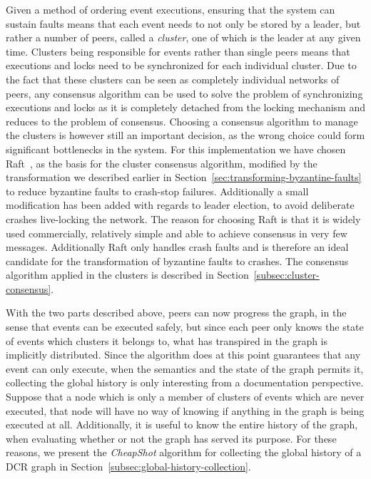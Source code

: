 \documentclass{article}
\begin{document}
	Given a method of ordering event executions, ensuring that the system can sustain faults means that each event needs to not only be stored by a leader, but rather a number of peers, called a \textit{cluster}, one of which is the leader at any given time.
	Clusters being responsible for events rather than single peers means that executions and locks need to be synchronized for each individual cluster.
	Due to the fact that these clusters can be seen as completely individual networks of peers, any consensus algorithm can be used to solve the problem of synchronizing executions and locks as it is completely detached from the locking mechanism and reduces to the problem of consensus.
	Choosing a consensus algorithm to manage the clusters is however still an important decision, as the wrong choice could form significant bottlenecks in the system.
	For this implementation we have chosen Raft~\cite{ongaro_search_2014}, as the basis for the cluster consensus algorithm, modified by the transformation we described earlier in Section~\ref{sec:transforming-byzantine-faults} to reduce byzantine faults to crash-stop failures.
    Additionally a small modification has been added with regards to leader election, to avoid deliberate crashes live-locking the network.
	The reason for choosing Raft is that it is widely used commercially, relatively simple and able to achieve consensus in very few messages.
	Additionally Raft only handles crash faults and is therefore an ideal candidate for the transformation of byzantine faults to crashes.
	The consensus algorithm applied in the clusters is described in Section~\ref{subsec:cluster-consensus}.

	With the two parts described above, peers can now progress the graph, in the sense that events can be executed safely, but since each peer only knows the state of events which clusters it belongs to, what has transpired in the graph is implicitly distributed.
	Since the algorithm does at this point guarantees that any event can only execute, when the semantics and the state of the graph permits it, collecting the global history is only interesting from a documentation perspective.
	Suppose that a node which is only a member of clusters of events which are never executed, that node will have no way of knowing if anything in the graph is being executed at all.
	Additionally, it is useful to know the entire history of the graph, when evaluating whether or not the graph has served its purpose.
	For these reasons, we present the \textit{CheapShot} algorithm for collecting the global history of a DCR graph in Section~\ref{subsec:global-history-collection}.
\end{document}
